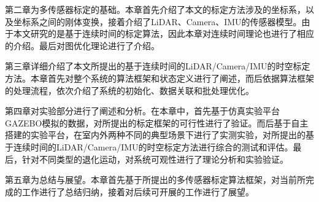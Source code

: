 第二章为多传感器标定的基础。本章首先介绍了本文的标定方法涉及的坐标系，以及坐标系之间的刚体变换，接着介绍了LiDAR、Camera、IMU的传感器模型。由于本文研究的是基于连续时间的标定算法，因此本章对连续时间理论也进行了相应的介绍。最后对图优化理论进行了介绍。

第三章详细介绍了本文所提出的基于连续时间的LiDAR/Camera/IMU的时空标定方法。本章首先对整个系统的算法框架和状态定义进行了阐述，而后依据算法框架的处理流程，依次介绍了系统的初始化、数据关联和批处理优化。

第四章对实验部分进行了阐述和分析。在本章中，首先基于仿真实验平台GAZEBO模拟的数据，对所提出的标定框架的可行性进行了验证。而后基于自主搭建的实验平台，在室内外两种不同的典型场景下进行了实测实验，对所提出的基于连续时间的LiDAR/Camera/IMU的时空标定方法进行综合的测试和评估。最后，针对不同类型的退化运动，对系统可观性进行了理论分析和实验验证。

第五章为总结与展望。本章首先基于所提出的多传感器标定算法框架，对当前所完成的工作进行了总结归纳，接着对后续可开展的工作进行了展望。

